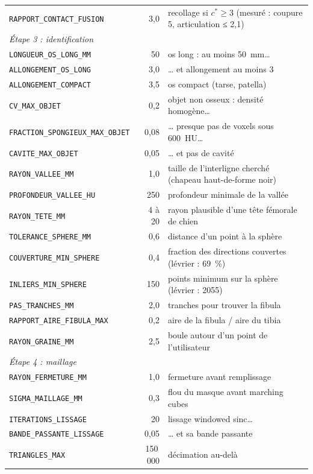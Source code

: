 \documentclass[11pt,a4paper]{article}
\begin{document}
\begin{longtable}{p{5.6cm}rp{7.4cm}}
\texttt{RAPPORT\_CONTACT\_FUSION} & 3,0 & recollage si $c^* \geq 3$ (mesuré : coupure 5, articulation ≤ 2,1) \\
\multicolumn{3}{l}{\textit{Étape 3 : identification}} \\
\texttt{LONGUEUR\_OS\_LONG\_MM} & 50 & os long : au moins 50~mm\ldots \\
\texttt{ALLONGEMENT\_OS\_LONG} & 3,0 & \ldots{} et allongement au moins 3 \\
\texttt{ALLONGEMENT\_COMPACT} & 3,5 & os compact (tarse, patella) \\
\texttt{CV\_MAX\_OBJET} & 0,2 & objet non osseux : densité homogène\ldots \\
\texttt{FRACTION\_SPONGIEUX\_MAX\_OBJET} & 0,08 & \ldots{} presque pas de voxels sous 600~HU\ldots \\
\texttt{CAVITE\_MAX\_OBJET} & 0,05 & \ldots{} et pas de cavité \\
\texttt{RAYON\_VALLEE\_MM} & 1,0 & taille de l'interligne cherché (chapeau haut-de-forme noir) \\
\texttt{PROFONDEUR\_VALLEE\_HU} & 250 & profondeur minimale de la vallée \\
\texttt{RAYON\_TETE\_MM} & 4 à 20 & rayon plausible d'une tête fémorale de chien \\
\texttt{TOLERANCE\_SPHERE\_MM} & 0,6 & distance d'un point à la sphère \\
\texttt{COUVERTURE\_MIN\_SPHERE} & 0,4 & fraction des directions couvertes (lévrier : 69~\%) \\
\texttt{INLIERS\_MIN\_SPHERE} & 150 & points minimum sur la sphère (lévrier : 2055) \\
\texttt{PAS\_TRANCHES\_MM} & 2,0 & tranches pour trouver la fibula \\
\texttt{RAPPORT\_AIRE\_FIBULA\_MAX} & 0,2 & aire de la fibula / aire du tibia \\
\texttt{RAYON\_GRAINE\_MM} & 2,5 & boule autour d'un point de l'utilisateur \\
\multicolumn{3}{l}{\textit{Étape 4 : maillage}} \\
\texttt{RAYON\_FERMETURE\_MM} & 1,0 & fermeture avant remplissage \\
\texttt{SIGMA\_MAILLAGE\_MM} & 0,3 & flou du masque avant marching cubes \\
\texttt{ITERATIONS\_LISSAGE} & 20 & lissage windowed sinc\ldots \\
\texttt{BANDE\_PASSANTE\_LISSAGE} & 0,05 & \ldots{} et sa bande passante \\
\texttt{TRIANGLES\_MAX} & 150\,000 & décimation au-delà \\

\end{longtable}
\end{document}
